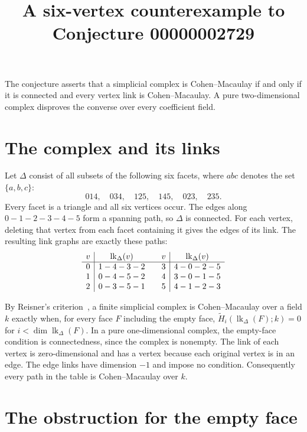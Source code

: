 \documentclass[11pt]{article}
\title{A six-vertex counterexample to Conjecture 00000002729}
\author{}
\date{}
\newcommand{\lk}{\operatorname{lk}}
\begin{document}
\maketitle

The conjecture asserts that a simplicial complex is Cohen--Macaulay if and
only if it is connected and every vertex link is Cohen--Macaulay. A pure
two-dimensional complex disproves the converse over every coefficient field.

\section*{The complex and its links}

Let $\Delta$ consist of all subsets of the following six facets, where $abc$
denotes the set $\{a,b,c\}$:
\[
  014,\quad 034,\quad 125,\quad 145,\quad 023,\quad 235.
\]
Every facet is a triangle and all six vertices occur. The edges along
$0-1-2-3-4-5$ form a spanning path, so $\Delta$ is connected.
For each vertex, deleting that vertex from each facet containing it gives
the edges of its link. The resulting link graphs are exactly these paths:
\[
\begin{array}{c|c@{\qquad}c|c}
v & \lk_\Delta(v) & v & \lk_\Delta(v) \\ \hline
0 & 1-4-3-2 & 3 & 4-0-2-5\\
1 & 0-4-5-2 & 4 & 3-0-1-5\\
2 & 0-3-5-1 & 5 & 4-1-2-3
\end{array}
\]

By Reisner's criterion~\cite[Theorem~5]{reisner}, a finite simplicial complex
is Cohen--Macaulay over a field $k$ exactly when, for every face $F$ including
the empty face, $\widetilde H_i(\lk_\Delta(F);k)=0$ for
$i<\dim\lk_\Delta(F)$. In a pure one-dimensional complex, the empty-face
condition is connectedness, since the complex is nonempty. The link of each
vertex is zero-dimensional and has a vertex because each original vertex is
in an edge. The edge links have dimension $-1$ and impose no condition.
Consequently every path in the table is Cohen--Macaulay over $k$.

\section*{The obstruction for the empty face}
\end{document}
